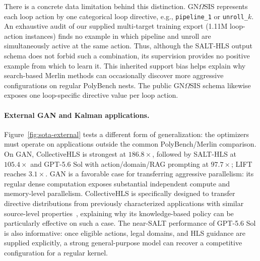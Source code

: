 There is a concrete data limitation behind this distinction.
GN$\Omega$SIS represents each loop action by one categorical loop
directive, e.g., \texttt{pipeline\_1} or \texttt{unroll\_$k$}.
An exhaustive audit of our supplied multi-target training export
(1.11M loop-action instances) finds no example in which pipeline and
unroll are simultaneously active at the same action. Thus, although
the SALT-HLS output schema does not forbid such a combination, its
supervision provides no positive example from which to learn it. This
inherited support bias helps explain why search-based Merlin methods can
occasionally discover more aggressive configurations on regular
PolyBench nests. The public GN$\Omega$SIS schema likewise exposes one
loop-specific directive value per loop action. \cite{ferikoglou2026gnomegasis}

\paragraph{External GAN and Kalman applications.}
Figure~\ref{fig:sota-external} tests a different form of generalization:
the optimizers must operate on applications outside the common
PolyBench/Merlin comparison. On GAN, CollectiveHLS is strongest at
$186.8\times$, followed by SALT-HLS at $105.4\times$ and
GPT-5.6 Sol with action/domain/RAG prompting at $97.7\times$;
LIFT reaches $3.1\times$. GAN is a favorable case for transferring
aggressive parallelism: its regular dense computation exposes substantial
independent compute and memory-level parallelism. CollectiveHLS is
specifically designed to transfer directive distributions from
previously characterized applications with similar source-level
properties~\cite{ferikoglou2024collectivehls}, explaining why its
knowledge-based policy can be particularly effective on such a case.
The near-SALT performance of GPT-5.6 Sol is also informative: once
eligible actions, legal domains, and HLS guidance are supplied explicitly,
a strong general-purpose model can recover a competitive configuration
for a regular kernel.

